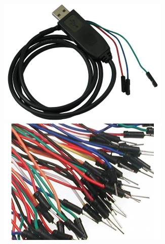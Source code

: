 \begin{frame}
\begin{columns}
    \includegraphics[height=0.20\textheight]{slides/kernel-shopping-list/usb-serial-cable-female.png} \\
    \includegraphics[height=0.15\textheight]{slides/kernel-shopping-list/jumper-wires.jpg}
  \end{columns}
\end{frame}
